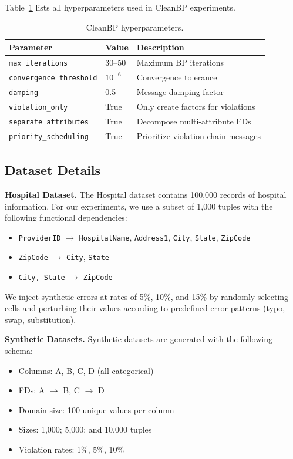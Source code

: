 \documentclass{article}
\begin{document}
Table~\ref{tab:hyperparams} lists all hyperparameters used in CleanBP experiments.

\begin{table}[h]
\centering
\caption{CleanBP hyperparameters.}
\label{tab:hyperparams}
\begin{tabular}{lll}
\toprule
Parameter & Value & Description \\
\midrule
\texttt{max\_iterations} & 30--50 & Maximum BP iterations \\
\texttt{convergence\_threshold} & $10^{-6}$ & Convergence tolerance \\
\texttt{damping} & 0.5 & Message damping factor \\
\texttt{violation\_only} & True & Only create factors for violations \\
\texttt{separate\_attributes} & True & Decompose multi-attribute FDs \\
\texttt{priority\_scheduling} & True & Prioritize violation chain messages \\
\bottomrule
\end{tabular}
\end{table}

\subsection{Dataset Details}

\textbf{Hospital Dataset.} The Hospital dataset \citep{rekatsinas2017holoclean} contains 100,000 records of hospital information. For our experiments, we use a subset of 1,000 tuples with the following functional dependencies:
\begin{itemize}
    \item \texttt{ProviderID} $\rightarrow$ \texttt{HospitalName}, \texttt{Address1}, \texttt{City}, \texttt{State}, \texttt{ZipCode}
    \item \texttt{ZipCode} $\rightarrow$ \texttt{City}, \texttt{State}
    \item \texttt{City, State} $\rightarrow$ \texttt{ZipCode}
\end{itemize}

We inject synthetic errors at rates of 5\%, 10\%, and 15\% by randomly selecting cells and perturbing their values according to predefined error patterns (typo, swap, substitution).

\textbf{Synthetic Datasets.} Synthetic datasets are generated with the following schema:
\begin{itemize}
    \item Columns: A, B, C, D (all categorical)
    \item FDs: A $\rightarrow$ B, C $\rightarrow$ D
    \item Domain size: 100 unique values per column
    \item Sizes: 1,000; 5,000; and 10,000 tuples
    \item Violation rates: 1\%, 5\%, 10\%
\end{itemize}
\end{document}
